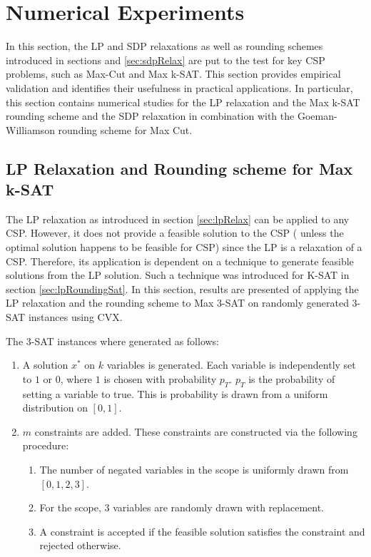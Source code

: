 \section{Numerical Experiments}
In this section, the LP and SDP relaxations as well as rounding schemes introduced in sections \label{sec:lpRelax} and \ref{sec:sdpRelax} are put to the test for key CSP problems, such as Max-Cut and Max k-SAT. This section provides empirical validation and identifies their usefulness in practical applications. In particular, this section contains numerical studies for the LP relaxation and the Max k-SAT rounding scheme and the SDP relaxation in combination with the Goeman-Williamson rounding scheme for Max Cut. 

\subsection{LP Relaxation and Rounding scheme for Max k-SAT}
The LP relaxation as introduced in section \ref{sec:lpRelax} can be applied to any CSP. However, it does not provide a feasible solution to the CSP ( unless the optimal solution happens to be feasible for CSP) since the LP is a relaxation of a CSP. Therefore, its application is dependent on a technique to generate feasible solutions from the LP solution. Such a technique was introduced for K-SAT in section \ref{sec:lpRoundingSat}. In this section, results are presented of applying the LP relaxation and the rounding scheme to Max 3-SAT on randomly generated 3-SAT instances using CVX.

The 3-SAT instances where generated as follows:
\begin{enumerate}
	\item A solution $x^*$ on $k$ variables is generated. Each variable is independently set to $1$ or $0$, where $1$ is chosen with probability $p_T$. $p_T$ is the probability of setting a variable to true. This is probability is drawn from a uniform distribution on $[0,1]$. 
	\item $m$ constraints are added. These constraints are constructed via the following procedure:
	\begin{enumerate}
		\item The number of negated variables in the scope is uniformly drawn from $[0,1,2,3]$.
		\item For the scope, 3 variables are randomly drawn with replacement.
		\item A constraint is accepted if the feasible solution satisfies the constraint and rejected otherwise.
	\end{enumerate}
\end{enumerate}

